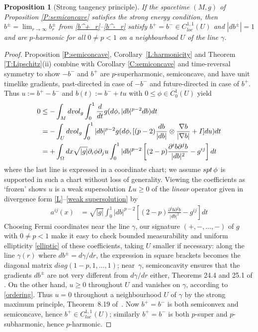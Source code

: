 \documentclass[12pt]{amsart}
\newcommand{\spt}{\mathop{\rm spt}}
\newcommand{\p}{{\partial}}
\newcommand{\vol}{{\rm vol}}
\newcommand{\vg}{\vol_g}
\newtheorem{proposition}[theorem]{Proposition}
\begin{document}
\begin{proposition}[Strong tangency principle]\label{P:maximum principle}
If the spacetime $(M,g)$ of Proposition \ref{P:semiconcave} satisfies the strong energy condition, then 
$b^\pm = \lim_{r\to \infty} b^\pm_r$ from \eqref{b^+_r}--\eqref{b^-_r}
satisfy $b^+=b^- \in C^{1,1}_{loc}(U)$ and $|db^\pm |=1$ and are $p$-harmonic for all $0\ne p<1$ on a 
neighbourhood $U$ of the line $\gamma$.  
\end{proposition}

\begin{proof}
Proposition \ref{P:semiconcave},
Corollary~\ref{L:harmonicity} and Theorem \ref{T:Lipschitz}(ii)
combine with Corollary \ref{C:semiconcave} and time-reversal symmetry to show 
$-b^-$ and $b^+$ are $p$-superharmonic, semiconcave, and have unit timelike gradients, past-directed in case of $-b^-$ and future-directed in case of $b^+$.
Thus  $u:=b^+- b^-$ and $b(t) := b^- + tu$ with $0 \le \phi \in C^1_0(U)$ yield
\begin{align*}
0 & \le- \int_M d\vg \int_0^1   \frac{d}{dt} g(d\phi, |db|^{p-2} db) dt
\\ &= -\int_U d\vg \int_0^1  |db|^{p- 2} g(d\phi, [(p-2)\frac{db}{|db|} \otimes \frac{\nabla b}{|\nabla b|}+I] d u) dt
\\ &= +\int_\Omega dx \sqrt{|g|} \p_i\phi \p_j u
\int_0^1  |db|^{p- 2}\left[
(2-p) \frac{\p^i b \p^jb}{|d b|^2} - g^{ij} \right] dt
\end{align*} 
where the last line is expressed in a coordinate chart;
we assume $\spt \phi$ is supported in such a chart without loss of generality. Viewing the coefficients as `frozen' shows $u$ is a weak supersolution $Lu\ge0$ of the {\em linear} operator given in divergence form \eqref{L}--\eqref{weak supersolution} by
\begin{align}
\label{A matrix}
a^{ij}(x) &= {\sqrt{|g|}}\int_0^1  |db|^{p- 2}\left[
(2-p) \frac{\p^i b \p^jb}{|d b|^2} - g^{ij} \right] dt 
\end{align}
Choosing Fermi coordinates near the line $\gamma$,
 our signature $(+, -, \dots, -)$ of $g$ with $0 \ne p<1$
 make it easy to check bounded measurability and uniform ellipticity \eqref{elliptic} of these coefficients,
taking $U$ smaller if necessary: along the line $\gamma(r)$ where $db^\pm =d\gamma/dr$,  the expression in square brackets becomes the diagonal matrix $diag(1-p,1,\ldots,1)$;
near~$\gamma$, semiconcavity ensures that the gradients $db^\pm$ are not very different from $d\gamma/dr$ either, Theorems 24.4 and 25.1  of \cite{Rockafellar70}.
 On the other hand,  $u \ge 0$ throughout $U$ and vanishes on $\gamma$, according to \eqref{ordering}.
Thus $u=0$ throughout a neighbourhood $U$ of $\gamma$ by the strong maximum principle, Theorem~8.19 of~\cite{GilbargTrudinger98}.
Now $b^+=b^-$ is both semiconvex and semiconcave, hence $b^+ \in C^{1,1}_{loc}(U)$; similarly $b^+=b^-$ is both $p$-super and $p$-subharmonic,  hence $p$-harmonic.
\end{proof}
\end{document}
